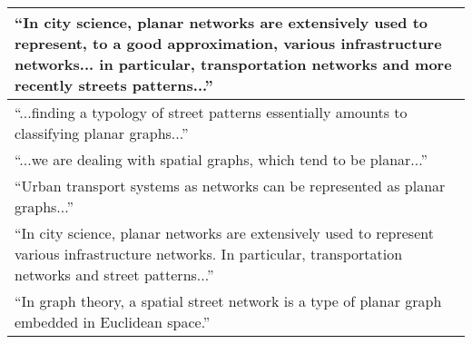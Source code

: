 \begin{tabular}{ | p{\textwidth} | }
\enquote{In city science, planar networks are extensively used to represent, to a good approximation, various infrastructure networks... in particular, transportation networks and more recently streets patterns...} \citep[p.~1]{viana_simplicity_2013} \\ \hline

\enquote{...finding a typology of street patterns essentially amounts to classifying planar graphs...} \citep[p.~2]{louf_typology_2014} \\ \hline

\enquote{...we are dealing with spatial graphs, which tend to be planar...} \citep[p.~2191]{zhong_detecting_2014} \\ \hline

\enquote{Urban transport systems as networks can be represented as planar graphs...} \citep[p.~2]{wang_resilience_2015} \\ \hline

\enquote{In city science, planar networks are extensively used to represent various infrastructure networks. In particular, transportation networks and street patterns...} \citep[p.~257]{barthelemy_paths_2017} \\ \hline

\enquote{In graph theory, a spatial street network is a type of planar graph embedded in Euclidean space.} \citep[p.~168]{law_defining_2017} \\ \hline

\end{tabular}
